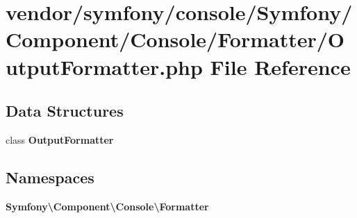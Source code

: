 \section{vendor/symfony/console/\+Symfony/\+Component/\+Console/\+Formatter/\+Output\+Formatter.php File Reference}
\label{_output_formatter_8php}
\subsection*{Data Structures}
\begin{DoxyCompactItemize}
\item 
class {\bf Output\+Formatter}
\end{DoxyCompactItemize}
\subsection*{Namespaces}
\begin{DoxyCompactItemize}
\item 
 {\bf Symfony\textbackslash{}\+Component\textbackslash{}\+Console\textbackslash{}\+Formatter}
\end{DoxyCompactItemize}
